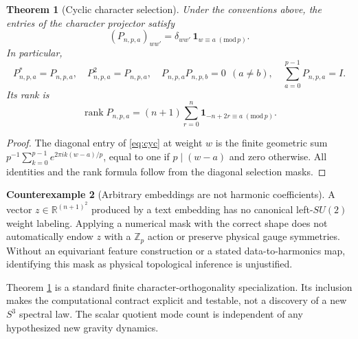 \documentclass[11pt,a4paper]{article}
\theoremstyle{plain}\newtheorem{theorem}{Theorem}[section]\newtheorem{proposition}[theorem]{Proposition}\newtheorem{lemma}[theorem]{Lemma}
\theoremstyle{definition}\newtheorem{definition}[theorem]{Definition}\newtheorem{remark}[theorem]{Remark}\newtheorem{counterexample}[theorem]{Counterexample}
\newcommand{\R}{\mathbb R}\newcommand{\C}{\mathbb C}\newcommand{\Z}{\mathbb Z}\newcommand{\EE}{\mathbb E}\newcommand{\norm}[1]{\left\lVert #1\right\rVert}\newcommand{\tr}{\operatorname{tr}}\newcommand{\rank}{\operatorname{rank}}\newcommand{\diag}{\operatorname{diag}}\newcommand{\softmax}{\operatorname{softmax}}\newcommand{\Span}{\operatorname{span}}\newcommand{\NOTE}{\textsc{Status:}}
\begin{document}
\begin{theorem}[Cyclic character selection]\label{th:cyc}
Under the conventions above, the entries of the character projector satisfy
\begin{equation*}(P_{n,p,a})_{ww\prime}=\delta_{ww\prime}\,\mathbf{1}_{w\equiv a\;(\mathrm{mod}\,p)}.\end{equation*}
In particular,
\begin{equation}
 P_{n,p,a}^*=P_{n,p,a},\quad P_{n,p,a}^2=P_{n,p,a},\quad P_{n,p,a}P_{n,p,b}=0\ \ (a\ne b),\quad
 \sum_{a=0}^{p-1}P_{n,p,a}=I.
\end{equation}
Its rank is
\begin{equation}\label{eq:rank}
 \rank P_{n,p,a}=(n+1)\sum_{r=0}^{n}\mathbf1_{-n+2r\equiv a\;(\mathrm{mod}\,p)}.
\end{equation}
\end{theorem}
\begin{proof}
The diagonal entry of \eqref{eq:cyc} at weight $w$ is the finite geometric sum
$p^{-1}\sum_{k=0}^{p-1}e^{2\pi i k(w-a)/p}$, equal to one if $p\mid(w-a)$ and zero otherwise. All identities and the rank formula follow from the diagonal selection masks.
\end{proof}
\begin{counterexample}[Arbitrary embeddings are not harmonic coefficients]
A vector $z\in\R^{(n+1)^2}$ produced by a text embedding has no canonical left-$SU(2)$ weight labeling. Applying a numerical mask with the correct shape does not automatically endow $z$ with a $\Z_p$ action or preserve physical gauge symmetries. Without an equivariant feature construction or a stated data-to-harmonics map, identifying this mask as physical topological inference is unjustified.
\end{counterexample}

Theorem \ref{th:cyc} is a standard finite character-orthogonality specialization. Its inclusion makes the computational contract explicit and testable, not a discovery of a new $S^3$ spectral law. The scalar quotient mode count is independent of any hypothesized new gravity dynamics.
\end{document}
